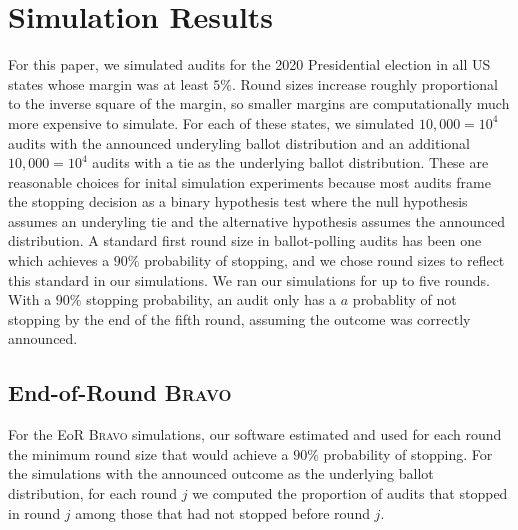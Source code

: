 \documentclass[runningheads]{llncs}
\newcommand{\BRAVO}{\textsc{Bravo}\xspace}
\begin{document}
\section{Simulation Results}

For this paper, we simulated audits for 
the 2020 Presidential election
in all US states whose margin was at least $5\%$.
Round sizes increase roughly proportional to the inverse
square of the margin, so 
smaller margins are computationally much more expensive to simulate.
For each of these states, we simulated 
$10,000=10^4$ audits with the announced
underyling ballot distribution
and an additional $10,000=10^4$ audits with a tie
as the underlying ballot distribution.
These are reasonable choices for inital simulation experiments
because most audits frame the stopping decision as a binary
hypothesis test where the null hypothesis assumes an underyling tie
and the alternative hypothesis assumes the announced distribution.
A standard first round size in ballot-polling audits
has been one which achieves a $90\%$ probability
of stopping, and we chose round sizes to reflect this standard
in our simulations.
We ran our simulations for up to five rounds.
With a $90\%$ stopping probability, 
an audit only has a $a$ probablity of not stopping
by the end of the fifth round, assuming the outcome was correctly
announced.

\subsection{End-of-Round \BRAVO}
For the EoR \BRAVO simulations, our software estimated and used for each round
the minimum round size that would achieve a $90\%$ probability of stopping.
For the simulations with the announced outcome as the underlying
ballot distribution, for each round $j$ we computed the proportion of audits 
that stopped in round $j$ among those that had not stopped before round $j$.
\end{document}
